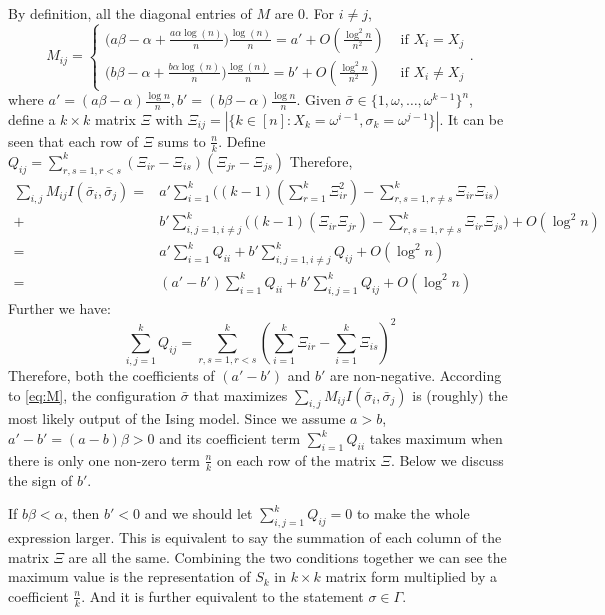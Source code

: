 \documentclass{article}
\begin{document}
By definition, all the diagonal entries of $M$ are $0$.
For $i\neq j$, 
$$
M_{ij}=\left\{ 
\begin{array}{cc}
 \big(a\beta-\alpha+\frac{a\alpha\log(n)}{n} \big) \frac{\log(n)}{n} = a' + O(\frac{\log^2 n}{n^2})
   & \text{~if~} X_i=X_j \\
  \big(b\beta-\alpha+\frac{b\alpha\log(n)}{n} \big) \frac{\log(n)}{n} = b' + O(\frac{\log^2 n}{n^2})
   & \text{~if~} X_i\neq X_j
\end{array}
\right. .
$$
where $a' =(a\beta - \alpha) \frac{\log n }{n}, b'=(b\beta - \alpha) \frac{\log n}{n}$.
Given $\bar{\sigma}\in\{1, \omega, \dots, \omega^{k-1}\}^n$, define a $k\times k$ matrix $\Xi$ with 
$\Xi_{ij} = |\{k \in [n]: X_k = \omega^{i-1}, \sigma_k = \omega^{j-1}\}|$. It can be seen that each row of $\Xi$ sums to $\frac{n}{k}$. Define $Q_{ij} = \sum_{r,s=1, r<s}^k (\Xi_{ir} - \Xi_{is})(\Xi_{jr} - \Xi_{js})$
Therefore,
\begin{equation} \label{eq:sMs}
\begin{aligned}
 \sum_{i,j}M_{ij}I(\bar{\sigma}_i, \bar{\sigma}_j)
= & a'\sum_{i=1}^k \big( (k-1)(\sum_{r=1}^k \Xi_{ir}^2) - \sum_{r,s=1,r \neq s}^k \Xi_{ir}\Xi_{is} \big) \\
+ & b'\sum_{i,j=1, i\neq j}^k  \big( (k-1)  (\Xi_{ir} \Xi_{jr}) - \sum_{r,s=1,r \neq s}^k \Xi_{ir}\Xi_{js}  \big) + O(\log^2 n)\\
= & a' \sum_{i=1}^k Q_{ii} + b' \sum_{i,j=1,i\neq j}^k Q_{ij} + O(\log^2 n ) \\
 = & ( a' - b') \sum_{i=1}^k Q_{ii} + b' \sum_{i,j=1}^k Q_{ij} + O(\log^2 n ) 
\end{aligned}
\end{equation}
Further we have:
$$
\sum_{i,j=1}^k Q_{ij} = \sum_{r,s=1, r<s}^k (\sum_{i=1}^k \Xi_{ir} - \sum_{i=1}^k \Xi_{is})^2
$$
Therefore, both the coefficients of $(a'-b')$ and $b'$ are non-negative.
According to \eqref{eq:M}, the configuration $\bar{\sigma}$ that maximizes $\sum_{i,j} M_{ij} I(\bar{\sigma}_i, \bar{\sigma}_j)$ is (roughly) the most likely output of the Ising model.
Since we assume $a>b$, $a'-b' = (a-b) \beta > 0$ and its coefficient term $\sum_{i=1}^k Q_{ii}$ takes maximum when there is only one non-zero term $\frac{n}{k}$ on each row of the matrix $\Xi$. Below we discuss the sign of $b'$.

If $b\beta<\alpha$, then $b' < 0$ and we should let $\sum_{i,j=1}^k Q_{ij} = 0$ to make the whole expression larger. This is equivalent to say the summation of each column of the matrix $\Xi$ are all the same. Combining the two conditions together we can see the maximum value is
the representation of $S_k$ in $k\times k$ matrix form multiplied by a coefficient $\frac{n}{k}$. And it is further equivalent to the statement $\sigma \in \Gamma$.
\end{document}
